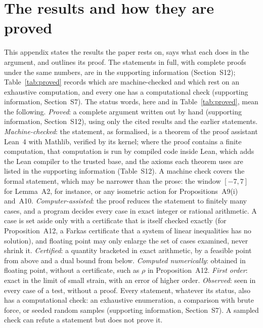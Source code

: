 
\appendix
\setcounter{table}{0}
\setcounter{figure}{0}
\renewcommand{\thetable}{\thesection\arabic{table}}
\renewcommand{\thefigure}{\thesection\arabic{figure}}
\section{The results and how they are proved}
\sloppy

This appendix states the results the paper rests on, says what each does in the argument, and outlines its proof. The statements in full, with complete proofs under the same numbers, are in the supporting information (Section~S12); Table~\ref{tab:proved} records which are machine-checked and which rest on an exhaustive computation, and every one has a computational check (supporting information, Section~S7). The status words, here and in Table~\ref{tab:proved}, mean the following. \emph{Proved}: a complete argument written out by hand (supporting information, Section~S12), using only the cited results and the earlier statements. \emph{Machine-checked}: the statement, as formalised, is a theorem of the proof assistant Lean~4 with Mathlib, verified by its kernel; where the proof contains a finite computation, that computation is run by compiled code inside Lean, which adds the Lean compiler to the trusted base, and the axioms each theorem uses are listed in the supporting information (Table~S12). A machine check covers the formal statement, which may be narrower than the prose: the window $[-7,7]$ for Lemma~A2, for instance, or any isometric action for Propositions~A9(i) and~A10. \emph{Computer-assisted}: the proof reduces the statement to finitely many cases, and a program decides every case in exact integer or rational arithmetic. A case is set aside only with a certificate that is itself checked exactly (for Proposition~A12, a Farkas certificate that a system of linear inequalities has no solution), and floating point may only enlarge the set of cases examined, never shrink it. \emph{Certified}: a quantity bracketed in exact arithmetic, by a feasible point from above and a dual bound from below. \emph{Computed numerically}: obtained in floating point, without a certificate, such as $\rho$ in Proposition~A12. \emph{First order}: exact in the limit of small strain, with an error of higher order. \emph{Observed}: seen in every case of a test, without a proof. Every statement, whatever its status, also has a computational check: an exhaustive enumeration, a comparison with brute force, or seeded random samples (supporting information, Section~S7). A sampled check can refute a statement but does not prove it.

